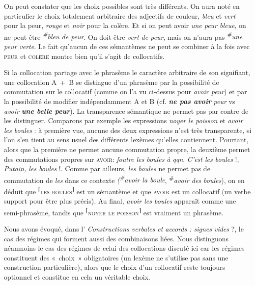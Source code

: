 On peut constater que les choix possibles sont très différents. On aura noté en particulier le choix totalement arbitraire des adjectifs de couleur, \textit{bleu} et \textit{vert} pour la peur, \textit{rouge} et \textit{noir} pour la colère. Et si on peut avoir \textit{une peur bleue}, on ne peut être \textit{\textsuperscript{\#}}\textit{bleu de peur}. On doit être \textit{vert de peur}, mais on n’aura pas \textit{\textsuperscript{\#}}\textit{une peur verte}. Le fait qu’aucun de ces sémantèmes ne peut se combiner à la fois avec \textsc{peur} et \textsc{colère} montre bien qu’il s’agit de collocatifs.

Si la collocation partage avec le phrasème le caractère arbitraire de son signifiant, une collocation A~+~B se distingue d’un phrasème par la possibilité de commutation sur le collocatif (comme on l’a vu ci-dessus pour \textit{avoir peur}) et par la possibilité de modifier indépendamment A et B (cf. \textbf{\textit{ne pas avoir}} \textit{peur} vs \textit{avoir} \textbf{\textit{une belle peur}}). La transparence sémantique ne permet pas par contre de les distinguer. Comparons par exemple les expressions \textit{noyer le poisson} et \textit{avoir les boules} : à première vue, aucune des deux expressions n’est très transparente, si l’on s’en tient au sens usuel des différents lexèmes qu’elles contiennent. Pourtant, alors que la première ne permet aucune commutation propre, la deuxième permet des commutations propres sur \textsc{avoir}: \textit{foutre les boules à qqn}, \textit{C’est les boules} !, \textit{Putain, les boules} !. Comme par ailleurs, \textit{les boules} ne permet pas de commutation de \textit{les} dans ce contexte \textit{(\textsuperscript{\#}}\textit{avoir la boule}, \textsuperscript{\#}\textit{avoir des boules}), on en déduit que \textsuperscript{⌈}\textsc{les} \textsc{boules}\textsuperscript{⌉} est un sémantème et que \textsc{avoir} est un collocatif (un verbe support pour être plus précis). Au final, \textit{avoir les boules} apparaît comme une semi-phrasème, tandis que \textsuperscript{⌈}\textsc{noyer} \textsc{le} \textsc{poisson}\textsuperscript{⌉} est vraiment un phrasème.

Nous avons évoqué, dans l’ \textit{Constructions verbales et accords : signes vides} ?, le cas des régimes qui forment aussi des combinaisons liées. Nous distinguons néanmoins le cas des régimes de celui des collocations discuté ici car les régimes constituent des «~choix~» obligatoires (un lexème ne s’utilise pas sans une construction particulière), alors que le choix d’un collocatif reste toujours optionnel et constitue en cela un véritable choix.


